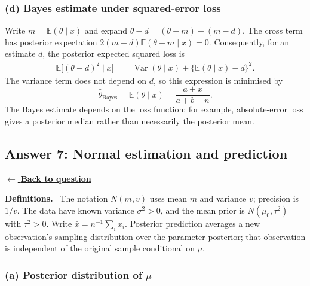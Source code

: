\documentclass[11pt,a4paper]{article}
\newcommand{\given}{\mathrel{|}}
\newcommand{\E}{\mathbb{E}}
\newcommand{\answernav}[1]{%
  \label{answer:#1}%
  \noindent\hyperref[question:#1]{$\leftarrow$ \textbf{Back to question}}%
  \par\smallskip}
\newcommand{\studyheading}[1]{%
  \par\medskip\noindent\textcolor{statblue}{\textbf{#1.}}\ }
\begin{document}
\subsubsection*{(d) Bayes estimate under squared-error loss}

Write $m=\E(\theta\given x)$ and expand
$\theta-d=(\theta-m)+(m-d)$. The cross term has posterior expectation
$2(m-d)\E(\theta-m\given x)=0$. Consequently, for an estimate $d$,
the posterior expected squared loss is
\begin{align*}
  \E\bigl[(\theta-d)^2\given x\bigr]
  &=
  \operatorname{Var}(\theta\given x)
  +\bigl\{\E(\theta\given x)-d\bigr\}^2.
\end{align*}
The variance term does not depend on $d$, so this expression is minimised by
\[
  \boxed{
  \widehat{\theta}_{\mathrm{Bayes}}
  =\E(\theta\given x)
  =\frac{a+x}{a+b+n}.
  }
\]
The Bayes estimate depends on the loss function: for example, absolute-error
loss gives a posterior median rather than necessarily the posterior mean.

\clearpage

\subsection{Answer 7: Normal estimation and prediction}
\answernav{7}

\studyheading{Definitions}
The notation $N(m,v)$ uses mean $m$ and variance $v$; precision is $1/v$.
The data have known variance $\sigma^2>0$, and the mean prior is $N(\mu_0,\tau^2)$ with $\tau^2>0$.
Write $\bar x=n^{-1}\sum_i x_i$.
Posterior prediction averages a new observation's sampling distribution over the parameter posterior; that observation is independent of the original sample conditional on $\mu$.

\subsubsection*{(a) Posterior distribution of $\mu$}
\end{document}
